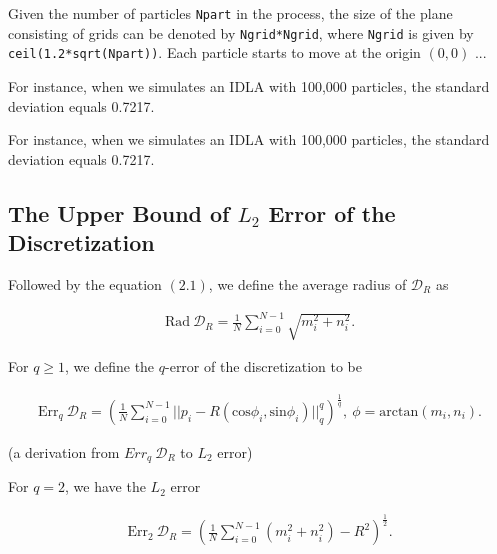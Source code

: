 \documentclass[letterpaper]{article}
\numberwithin{equation}{section} %
\numberwithin{figure}{section} %
\numberwithin{table}{section} %
\begin{document}
 
 
 Given the number of particles \texttt{Npart} in the process, the size of the plane consisting of grids can be denoted by \texttt{Ngrid*Ngrid}, where \texttt{Ngrid} is given by \texttt{ceil(1.2*sqrt(Npart))}. Each particle starts to move at the origin $(0, 0)$ ...
 
 For instance, when we simulates an IDLA with 100,000 particles, the standard deviation equals 0.7217.   
 
 For instance, when we simulates an IDLA with 100,000 particles, the standard deviation equals 0.7217.   

\subsection{The Upper Bound of $L_{2}$ Error of the Discretization}

Followed by the equation $(2.1)$, we define the average radius of $\mathcal{D}_R$ as 

\begin{align} 
\text{Rad} \ \mathcal{D}_R = \frac{1}{N} \sum_{i=0}^{N-1} {\sqrt{m_{i}^2+n_{i}^2}}.
\end{align}

For $q \geq 1$, we define the $q$-error of the discretization to be 

\begin{align} 
\text{Err}_{q} \ \mathcal{D}_R=(\frac{1}{N} \sum_{i=0}^{N-1} {||p_{i} - R(\text{cos} \phi_{i}, \text{sin} \phi_{i})||_q^q})^{\frac{1}{q}}, \ \phi = \text{arctan}(m_i,n_i).
\end{align}

(a derivation from $Err_{q} \ \mathcal{D}_R$ to $L_2$ error)

For $q=2$, we have the $L_2$ error 

\begin{align} 
\text{Err}_2 \ \mathcal{D}_R=(\frac{1}{N} \sum_{i=0}^{N-1} (m_i^2+n_i^2)-R^2)^{\frac{1}{2}}.
\end{align}
\end{document}
